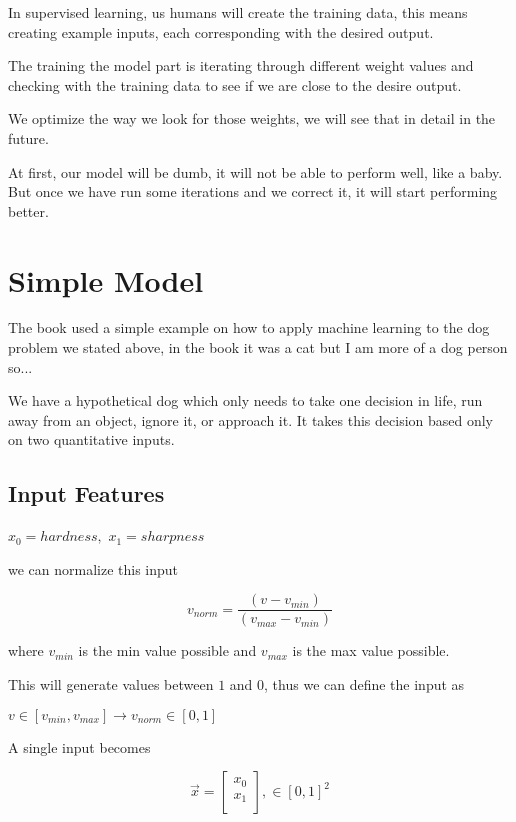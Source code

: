 \documentclass[twocolumn]{article}
\begin{document}
In supervised learning, us humans will create the training data, this means
creating example inputs, each corresponding with the desired output.

The training the model part is iterating through different weight values and
checking with the training data to see if we are close to the desire output.

We optimize the way we look for those weights, we will see that in detail in
the future.

At first, our model will be dumb, it will not be able to perform well, like a
baby. But once we have run some iterations and we correct it, it will start
performing better.

\section{Simple Model}

The book used a simple example on how to apply machine learning to the dog
problem we stated above, in the book it was a cat but I am more of a dog person
so...

We have a hypothetical dog which only needs to take one decision in life, run
away from an object, ignore it, or approach it. It takes this decision based
only on two quantitative inputs.

\subsection{Input Features}

{$ \displaystyle x_0 = hardness,$}
{$ x_1 = sharpness $}

we can normalize this input

\begin{equation}
v_{norm} = \dfrac{(v - v_{min})}{(v_{max} - v_{min})}
\end{equation}

where {$v_{min}$} is the min value possible and {$v_{max}$} is the max value
possible.

This will generate values between $1$ and $0$, thus we can define the input as

{$ v \in [v_{min}, v_{max}] \rightarrow v_{norm} \in [0, 1] $}

A single input becomes

\begin{equation}
    \vec{x} = \begin{bmatrix}
                x_0 \\
                x_1 \\
              \end{bmatrix},
              \in [0, 1]^2
\end{equation}
\end{document}
